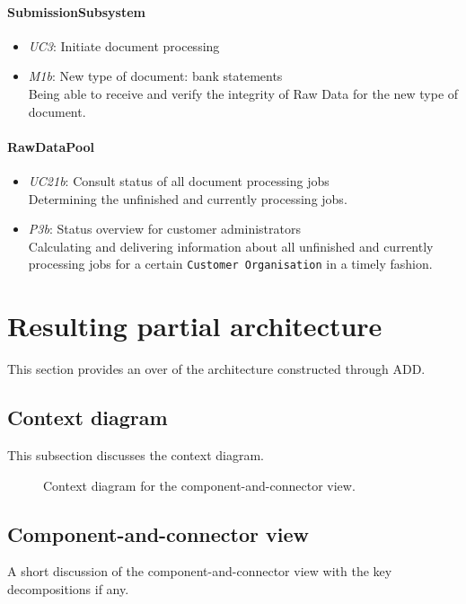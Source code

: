 \documentclass[a4paper,10pt]{article}
\begin{document}
\paragraph{SubmissionSubsystem}
\begin{itemize}
	\item \emph{UC3}: Initiate document processing
	\item \emph{M1b}: New type of document: bank statements\\
	Being able to receive and verify the integrity of Raw Data for the new type of document.
\end{itemize}

\paragraph{RawDataPool}
\begin{itemize}
	\item \emph{UC21b}: Consult status of all document processing jobs\\
	Determining the unfinished and currently processing jobs.
	\item \emph{P3b}: Status overview for customer administrators\\
	Calculating and delivering information about all unfinished and currently processing jobs for a certain \texttt{Customer Organisation} in a timely fashion.
\end{itemize}

\section{Resulting partial architecture}\label{sec:architecture}
This section provides an over of the architecture constructed through ADD\@.

\subsection{Context diagram}
This subsection discusses the context diagram.

\begin{figure}[!htp]
    \centering
    \caption{Context diagram for the component-and-connector view.
        }\label{fig:cc_context}
\end{figure}

\subsection{Component-and-connector view}
A short discussion of the component-and-connector view with the key
decompositions if any.
\end{document}
